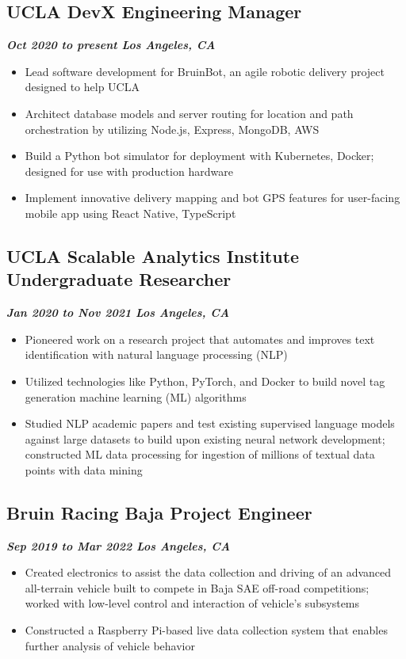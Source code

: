 \documentclass[10pt]{article}
\begin{document}
\begin{raggedright}
        \subsection*{\textbf{\large{UCLA DevX \textendash{} Engineering Manager}}} \hfill \textbf{\textit{Oct 2020 to present \textendash{} Los Angeles, CA}}
        \begin{itemize}
            \item Lead software development for BruinBot, an agile robotic delivery project designed to help UCLA
            \item Architect database models and server routing for location and path orchestration by utilizing Node.js, Express, MongoDB, AWS
            \item Build a Python bot simulator for deployment with Kubernetes, Docker; designed for use with production hardware
            \item Implement innovative delivery mapping and bot GPS features for user-facing mobile app using React Native, TypeScript
        \end{itemize}

        \subsection*{\textbf{\large{UCLA Scalable Analytics Institute \textendash{} Undergraduate Researcher}}} \hfill \textbf{\textit{Jan 2020 to Nov 2021 \textendash{} Los Angeles, CA}}
        \begin{itemize}
            \item Pioneered work on a research project that automates and improves text identification with natural language processing (NLP)
            \item Utilized technologies like Python, PyTorch, and Docker to build novel tag generation machine learning (ML) algorithms
            \item Studied NLP academic papers and test existing supervised language models against large datasets to build upon existing neural network development; constructed ML data processing for ingestion of millions of textual data points with data mining
        \end{itemize}

        \subsection*{\textbf{\large{Bruin Racing Baja \textendash{} Project Engineer}}} \hfill \textbf{\textit{Sep 2019 to Mar 2022 \textendash{} Los Angeles, CA}}
        \begin{itemize}
            \item Created electronics to assist the data collection and driving of an advanced all-terrain vehicle built to compete in Baja SAE off-road competitions; worked with low-level control and interaction of vehicle’s subsystems
            \item Constructed a Raspberry Pi-based live data collection system that enables further analysis of vehicle behavior
        \end{itemize}
    

\end{raggedright}
\end{document}
